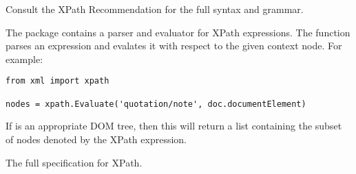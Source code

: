 \documentclass{howto}
\begin{document}
Consult the XPath Recommendation for the full syntax and grammar.

The  package contains a parser and evaluator for
XPath expressions.  The  function parses an expression and evalates it with
respect to the given  context node.  For example:

\begin{verbatim}
from xml import xpath

nodes = xpath.Evaluate('quotation/note', doc.documentElement)
\end{verbatim}

If  is an appropriate DOM tree, then this will return a list
containing the subset of nodes denoted by the XPath expression.


\begin{seealso}
           {The full specification for XPath.}
\end{seealso}
\end{document}
